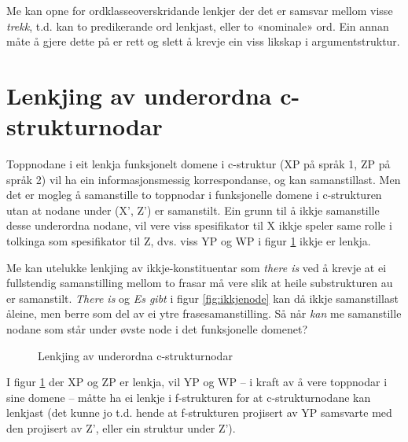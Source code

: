\documentclass[11pt,a4paper,oneside,draft]{book}
\begin{document}
Me kan opne for ordklasseoverskridande lenkjer der det er samsvar
mellom visse \emph{trekk}, t.d. kan to predikerande ord lenkjast, eller to
«nominale» ord. Ein annan måte å gjere dette på er rett og slett å
krevje ein viss likskap i argumentstruktur. 

\section{Lenkjing av underordna c-strukturnodar}
\label{sec-3.6}

\label{SEC:subnode}

Toppnodane i eit lenkja funksjonelt domene i c-struktur (XP på språk
1, ZP på språk 2) vil ha ein informasjonsmessig korrespondanse, og kan
samanstillast. Men det er mogleg å samanstille to toppnodar i
funksjonelle domene i c-strukturen utan at nodane under (X', Z') er
samanstilt. Ein grunn til å ikkje samanstille desse underordna nodane,
vil vere viss spesifikator til X ikkje speler same rolle i tolkinga
som spesifikator til Z, dvs. viss YP og WP i figur \ref{fig:subnode}
ikkje er lenkja.


Me kan utelukke lenkjing av ikkje-konstituentar som \emph{there is} ved å
krevje at ei fullstendig samanstilling mellom to frasar må vere slik
at heile substrukturen au er samanstilt. \emph{There is} og \emph{Es gibt} i
figur \ref{fig:ikkjenode} kan då ikkje samanstillast åleine, men berre
som del av ei ytre frasesamanstilling.
Så når \emph{kan} me samanstille nodane som står under øvste node i
det funksjonelle domenet?

\begin{figure}[htp]
   \vfill{} %
   \caption{Lenkjing av underordna c-strukturnodar}
   \label{fig:subnode}
  \end{figure}

I figur \ref{fig:subnode} der XP og ZP er lenkja, vil YP og WP -- i
kraft av å vere toppnodar i sine domene -- måtte ha ei lenkje i
f-strukturen for at c-strukturnodane kan lenkjast (det kunne jo
t.d. hende at f-strukturen projisert av YP samsvarte med den projisert
av Z', eller ein struktur under Z').
\end{document}
